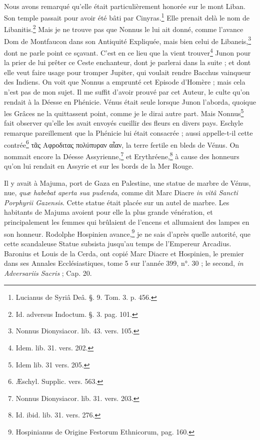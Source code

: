 \documentclass[a4paper, 11pt, oneside, polutonikogreek, french]{article}
\begin{document}
\paragraph{}
Nous avons remarqué qu'elle était particulièrement honorée sur le mont Liban. Son temple passait pour avoir été bâti par Cinyras.\footnote{Lucianus de Syriâ Deâ. §. 9. Tom. 3. p. 456.} Elle prenait delà le nom de Libanitis.\footnote{Id. adversus Indoctum. §. 3. pag. 101.} Mais je ne trouve pas que Nonnus le lui ait donné, comme l'avance Dom de Montfaucon dans son Antiquité Expliquée, mais bien celui de Libaneis,\footnote{Nonnus Dionysiacor. lib. 43. vers. 105.} dont ne parle point ce sçavant. C'est en ce lieu que la vient trouver\footnote{Idem. lib. 31. vers. 202.} Junon pour la prier de lui prêter ce Ceste enchanteur, dont je parlerai dans la suite ; et dont elle veut faire usage pour tromper Jupiter, qui voulait rendre Bacchus vainqueur des Indiens. On voit que Nonnus a emprunté cet Episode d'Homère ; mais cela n'est pas de mon sujet. Il me suffit d'avoir prouvé par cet Auteur, le culte qu'on rendait à la Déesse en Phénicie. Vénus était seule lorsque Junon l'aborda, quoique les Grâces ne la quittassent point, comme je le dirai autre part. Mais Nonnus\footnote{Idem lib. 31 vers. 205.} fait observer qu'elle les avait envoyés cueillir des fleurs en divers pays. Eschyle remarque pareillement que la Phénicie lui était consacrée ; aussi appelle-t-il cette contrée\footnote{Æschyl. Supplic. vers. 563.} τᾶς Αφροδιτας πολύπυραν αἶαν, la terre fertile en bleds de Vénus. On nommait encore la Déesse Assyrienne,\footnote{Nonnus Dionysiacor. lib. 31. vers. 203.} et Erythréene,\footnote{Id. ibid. lib. 31. vers. 276.} à cause des honneurs qu'on lui rendait en Assyrie et sur les bords de la Mer Rouge.

Il y avait à Majuma, port de Gaza en Palestine, une statue de marbre de Vénus, nue, \emph{quæ habebat aperta sua pudenda}, comme dit Marc Diacre \emph{in vitâ Sancti Porphyrii Gazensis}. Cette statue était placée sur un autel de marbre. Les habitants de Majuma avoient pour elle la plus grande vénération, et principalement les femmes qui brûlaient de l'encens et allumaient des lampes en son honneur. Rodolphe Hospinien avance,\footnote{Hospinianus de Origine Festorum Ethnicorum, pag. 160.} je ne sais d'après quelle autorité, que cette scandaleuse Statue subsista jusqu'au temps de l'Empereur Arcadius. Baronius et Louis de la Cerda, ont copié Marc Diacre et Hospinien, le premier dans ses Annales Ecclésiastiques, tome 5 sur l'année 399, n°. 30 ; le second, \emph{in Adversariis Sacris} ; Cap. 20.
\end{document}
